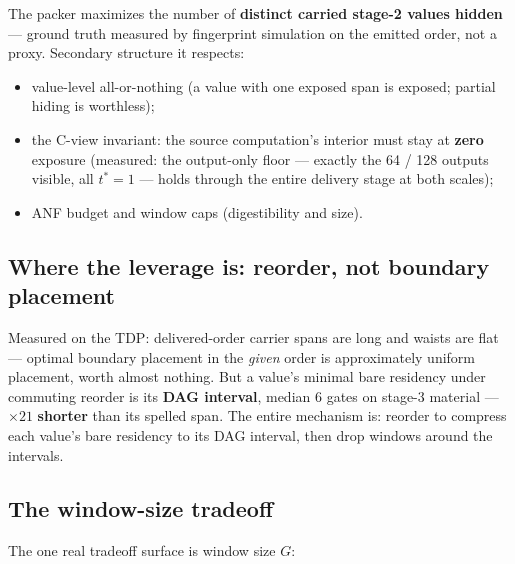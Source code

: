 \documentclass[11pt]{article}
\newcommand{\tstar}{t^{*}}
\begin{document}
The packer maximizes the number of \textbf{distinct carried stage-2 values
hidden} --- ground truth measured by fingerprint simulation on the emitted
order, not a proxy. Secondary structure it respects:

\begin{itemize}
\item value-level all-or-nothing (a value with one exposed span is exposed;
  partial hiding is worthless);
\item the C-view invariant: the source computation's interior must stay at
  \textbf{zero} exposure (measured: the output-only floor --- exactly the 64
  / 128 outputs visible, all $\tstar{=}1$ --- holds through the entire
  delivery stage at both scales);
\item ANF budget and window caps (digestibility and size).
\end{itemize}

\subsection{Where the leverage is: reorder, not boundary placement}
\label{sec:leverage}

Measured on the TDP: delivered-order carrier spans are long and waists are
flat --- optimal boundary placement in the \emph{given} order is
approximately uniform placement, worth almost nothing. But a value's minimal
bare residency under commuting reorder is its \textbf{DAG interval}, median 6
gates on stage-3 material --- $\times 21$ \textbf{shorter} than its spelled
span. The entire mechanism is: reorder to compress each value's bare
residency to its DAG interval, then drop windows around the intervals.

\subsection{The window-size tradeoff}

The one real tradeoff surface is window size $G$:
\end{document}
